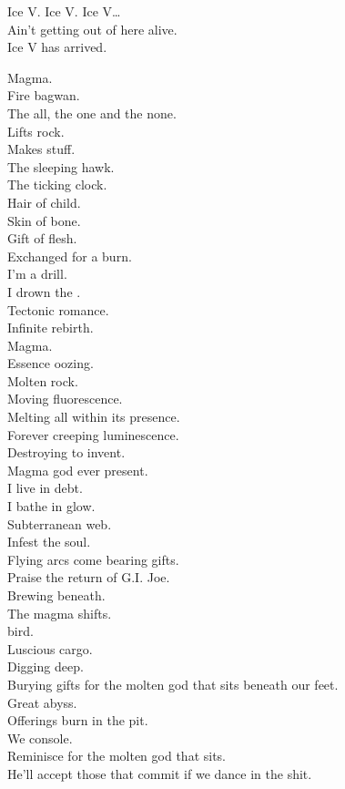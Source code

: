 Ice V. Ice V. Ice V… \\

Ain't getting out of here alive. \\
Ice V has arrived. \\




Magma. \\
Fire bagwan. \\
The all, the one and the none. \\
Lifts rock. \\
Makes stuff. \\
The sleeping hawk. \\
The ticking clock. \\
Hair of child. \\
Skin of bone. \\
Gift of flesh. \\
Exchanged for a burn. \\
I'm a drill. \\
I drown the . \\
Tectonic romance. \\
Infinite rebirth. \\

Magma. \\
Essence oozing. \\
Molten rock. \\
Moving fluorescence. \\
Melting all within its presence. \\
Forever creeping luminescence. \\
Destroying to invent. \\
Magma god ever present. \\
I live in debt. \\
I bathe in glow. \\
Subterranean web. \\
Infest the soul. \\
Flying arcs come bearing gifts. \\
Praise the return of G.I. Joe. \\
Brewing beneath. \\
The magma shifts. \\
 bird. \\
Luscious cargo. \\
Digging deep. \\
Burying gifts for the molten god that sits beneath our feet. \\
Great abyss. \\
Offerings burn in the pit. \\
We console. \\
Reminisce for the molten god that sits. \\
He'll accept those that commit if we dance in the shit. \\

